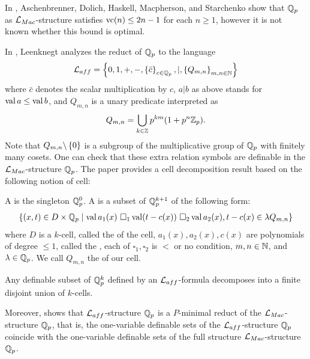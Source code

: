 \documentclass{amsart}
\begin{document}
In \cite{density}, Aschenbrenner, Dolich, Haskell, Macpherson, and Starchenko show that $\mathbb{Q}_p$ as $\mathcal L_{Mac}$-structure satisfies $\operatorname{vc}(n) \leq 2n - 1$
for each $n \geq 1$, however it is not known whether this bound is optimal.

In \cite{reduct}, Leenknegt analyzes the reduct of $\mathbb{Q}_p$ to the language
\begin{align*}
  \mathcal L_{aff}  = \left\{0, 1, +, -, \left\{\bar c\right\}_{c \in \mathbb{Q}_p}, |, \left\{Q_{m,n}\right\}_{m,n\in \mathbb{N}}\right\}
\end{align*}
where $\bar c$ denotes the scalar multiplication by $c$,
$a | b$ as above stands for $\operatorname{val} a \leq \operatorname{val} b$,
and $Q_{m,n}$ is a unary predicate interpreted as
\begin{align*}
  Q_{m,n} = \bigcup_{k \in \mathbb{Z}} p^{km} (1 + p^n\mathbb{Z}_p).
\end{align*}
Note that $Q_{m,n} \backslash \left\{0\right\}$ is a subgroup of the multiplicative group of $\mathbb{Q}_p$ with finitely many cosets.
One can check that these extra relation symbols are definable in the $\mathcal L_{Mac}$-structure $\mathbb{Q}_p$.
The paper \cite{reduct} provides a cell decomposition result based on the following notion of cell:

\begin{Definition} \label{cell}
  A  is the singleton $\mathbb{Q}_p^0$.
  A  is a subset of $\mathbb{Q}_p^{k+1}$ of the following form:
  \begin{align*}
    \left\{(x, t) \in D \times \mathbb{Q}_p \mid \operatorname{val} a_1(x) \ \square_1 \operatorname{val} (t - c(x)) \ \square_2 \operatorname{val} a_2(x), t - c(x) \in \lambda Q_{m,n} \right\}
  \end{align*}
  where $D$ is a $k$-cell, called the  of the cell,
  $a_1(x), a_2(x), c(x)$ are polynomials of degree $\leq 1$, called the ,
  each of $\square_1, \square_2$ is $<$ or no condition,
  $m,n \in \mathbb{N}$,
  and
  $\lambda  \in\mathbb{Q}_p$.
  We call $Q_{m,n}$ the  of our cell.
\end{Definition}

\begin{Theorem}[Leenknegt '12] \label{leen}
  Any definable subset of $\mathbb{Q}_p^k$ defined by an $\mathcal L_{aff}$-formula decomposes into a finite disjoint union of $k$-cells.
\end{Theorem}  

Moreover, \cite{reduct} shows that $\mathcal L_{aff}$-structure $\mathbb{Q}_p$ is a $P$-minimal reduct
of the $\mathcal L_{Mac}$-structure $\mathbb{Q}_p$,
that is, the one-variable definable sets of the $\mathcal L_{aff}$-structure $\mathbb{Q}_p$
coincide with the one-variable definable sets of the full structure $\mathcal L_{Mac}$-structure $\mathbb{Q}_p$.
\end{document}
